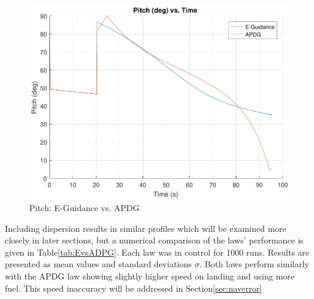 \begin{figure}[H]
	\centering
	\begin{minipage}{4.5 in}
		\includegraphics[width=\linewidth]{Figures/fatEvsADPG.pdf}
		\caption{Pitch: E-Guidance vs. APDG \label{fig:fatEvsADPG} }
	\end{minipage}
\end{figure}

Including dispersion results in similar profiles which will be examined more closely in later sections, but a numerical comparison of the laws' performance is given in Table\:\ref{tab:EvsADPG}. Each law was in control for 1000 runs. Results are presented as mean values and standard deviations $\sigma$. Both laws perform similarly with the APDG law showing slightly higher speed on landing and using more fuel. This speed inaccuracy will be addressed in Section\:\ref{sec:naverror}

